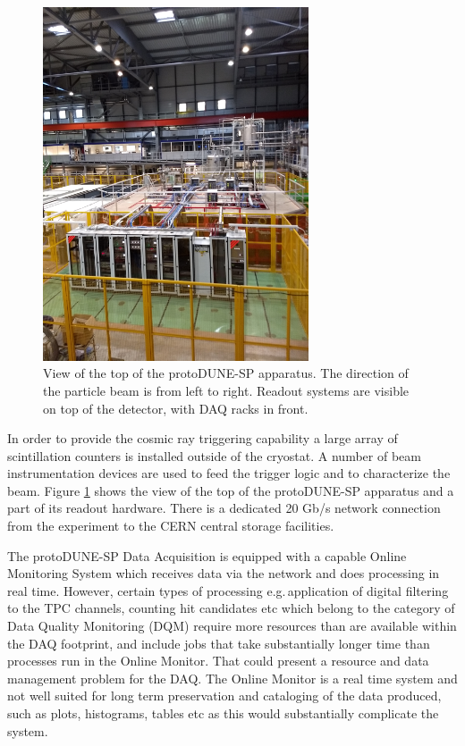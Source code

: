 \documentclass{webofc}
\newcommand{\pd}{protoDUNE\xspace}
\begin{document}
\begin{figure}[tb]
\centering\includegraphics[width=0.7\textwidth]{figures/np04_photo_2018_v1.png}
\caption{\label{fig:np04_photo}
View of the top of the \pd-SP apparatus.
The direction of the particle beam is from left to right.
Readout systems are visible on top of the detector, with DAQ racks in front.
}
\end{figure}


In order to provide the cosmic ray triggering capability a large array of scintillation
counters is installed outside of the cryostat. A number of beam instrumentation devices
are used to feed the  trigger logic and to characterize the beam. Figure \ref{fig:np04_photo}
shows the view of the top of the \pd-SP apparatus and a part of its readout hardware.
There is a dedicated 20 Gb/s network connection from the experiment to the CERN central storage facilities.

The \pd-SP Data Acquisition is equipped with a capable Online Monitoring System which receives data via
the network and does processing in real time. However, certain types of processing e.g.\,application of
digital filtering to the TPC channels, counting hit candidates etc which belong to the
category of Data Quality Monitoring (DQM) require more resources than are available within
the DAQ footprint, and include jobs that take substantially longer time than processes run in the
Online Monitor. That could present a resource and data management problem for the DAQ.
The Online Monitor is a real time system
and not well suited for long term preservation and cataloging of the data produced, such as plots,
histograms, tables etc as this would substantially complicate the system.
\end{document}

